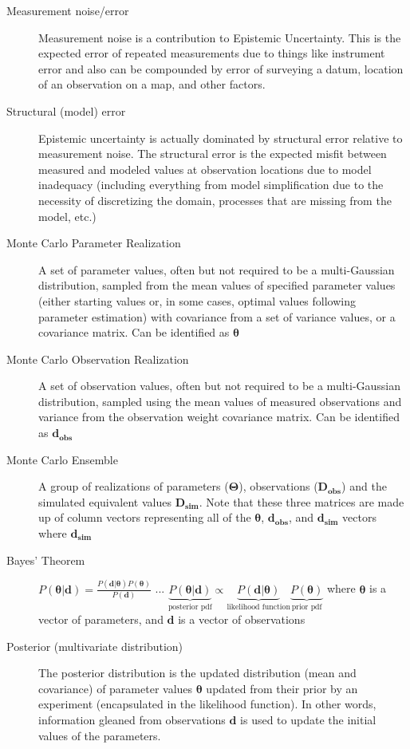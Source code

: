 \documentclass[english]{article}
\begin{document}
\begin{description}
\item [Measurement noise/error] Measurement noise is a contribution to Epistemic Uncertainty. This is the expected error of repeated measurements due to things like instrument error and also can be compounded by error of surveying a datum, location of an observation on a map, and other factors. 
\item [Structural (model) error] Epistemic uncertainty is actually dominated by structural error relative to measurement noise. The structural error is the expected misfit between measured and modeled values at observation locations due to model inadequacy (including everything from model simplification due to the necessity of discretizing the domain, processes that are missing from the model, etc.)
\item [Monte Carlo Parameter Realization] A set of parameter values, often but not required to be a multi-Gaussian distribution, sampled from the mean values of specified parameter values (either starting values or, in some cases, optimal values following parameter estimation) with covariance from a set of variance values, or a covariance matrix. Can be identified as $\mathbf{\theta}$ 
\item [Monte Carlo Observation Realization] A set of observation values, often but not required to be a multi-Gaussian distribution, sampled using the mean values of measured observations and variance from the observation weight covariance matrix. Can be identified as $\boldsymbol{d_{obs}}$
\item [Monte Carlo Ensemble] A group of realizations of parameters ($\mathbf{\Theta}$), observations ($\mathbf{D_{obs}}$) and the simulated equivalent values $\mathbf{D_{sim}}$. Note that these three matrices are made up of column vectors representing all of the $\boldsymbol{\theta}$, $\mathbf{d_{obs}}$, and  $\mathbf{d_{sim}}$ vectors where $\mathbf{d_{sim}}$ 
\item [Bayes' Theorem] $P\left(\boldsymbol{\theta}|\boldsymbol{d}\right)=\frac{P\left(\textbf{d}|\boldsymbol{\theta}\right) P\left(\boldsymbol{\theta}\right)}{P\left(\textbf{d}\right)}$ ... $\underbrace{P\left(\boldsymbol{\theta}|\textbf{d}\right)}_{\text{posterior pdf}} \propto \underbrace{P\left(\boldsymbol{d}|\boldsymbol{\theta}\right) }_{\text{likelihood function}}\underbrace{P\left(\boldsymbol{\theta}\right)}_{\text{prior pdf}}$  \newline{} where $\boldsymbol{\theta}$ is a vector of parameters, and $\mathbf{d}$ is a vector of observations
\item [Posterior (multivariate distribution)] The posterior distribution is the updated distribution (mean and covariance) of parameter values $\boldsymbol{\theta}$  updated from their prior by an experiment (encapsulated in the likelihood function). In other words, information gleaned from observations $\mathbf{d}$ is used to update the initial values of the parameters.

\end{description}
\end{document}
